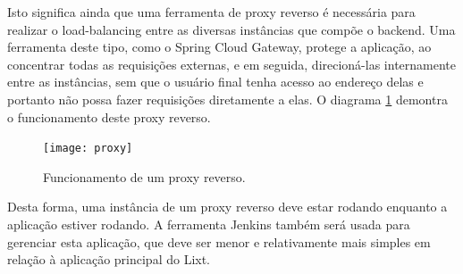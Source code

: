 Isto significa ainda que uma ferramenta de \gls{proxy} reverso é necessária
para realizar o \gls{load-balancing} entre as diversas instâncias que
compõe o \gls{backend}. Uma ferramenta deste tipo, como o Spring Cloud
Gateway, protege a aplicação, ao concentrar todas as requisições
externas, e em seguida, direcioná-las internamente entre as
instâncias, sem que o usuário final tenha acesso ao endereço delas e
portanto não possa fazer requisições diretamente a elas.
O diagrama \ref{fig:proxy} demontra o funcionamento deste proxy
reverso.

\begin{figure}
  \centering
  \caption{Funcionamento de um proxy reverso.}
  \label{fig:proxy}
  \texttt{[image: proxy]}
\end{figure}

Desta forma, uma instância de um proxy reverso deve estar rodando
enquanto a aplicação estiver rodando. A ferramenta Jenkins também será
usada para gerenciar esta aplicação, que deve ser menor e
relativamente mais simples em relação à aplicação principal do Lixt.

